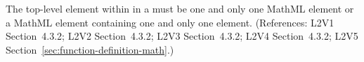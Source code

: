 The top-level element within  in a \FunctionDefinition must be
one and only one MathML  element or a MathML
 element containing one and only one 
element.  (References: L2V1 Section~4.3.2; L2V2 Section~4.3.2;
L2V3 Section~4.3.2; L2V4 Section~4.3.2; L2V5 Section~\ref{sec:function-definition-math}.)

